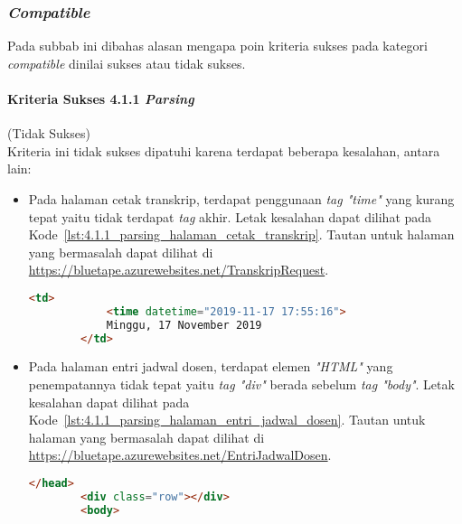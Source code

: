 \subsubsection{\textit{Compatible}}
\label{subsubsec:kepatuhan_bluetape_compatible}
Pada subbab ini dibahas alasan mengapa poin kriteria sukses pada kategori \textit{compatible} dinilai sukses atau tidak sukses.

\paragraph{Kriteria Sukses 4.1.1 \textit{Parsing}}
\label{par:kepatuhan_bluetape_kriteria_sukses_4.1.1}
(Tidak Sukses)\\

Kriteria ini tidak sukses dipatuhi karena terdapat beberapa kesalahan, antara lain:

\begin{itemize}
    \item Pada halaman cetak transkrip, terdapat penggunaan \textit{tag "time"} yang kurang tepat yaitu tidak terdapat \textit{tag} akhir. Letak kesalahan dapat dilihat pada \mbox{Kode \ref{lst:4.1.1_parsing_halaman_cetak_transkrip}}. Tautan untuk halaman yang bermasalah dapat dilihat di \url{https://bluetape.azurewebsites.net/TranskripRequest}.
    \begin{lstlisting}[frame=single, label={lst:4.1.1_parsing_halaman_cetak_transkrip}, language=HTML, caption=Pelanggaran Kriteria Sukses 4.1.1 pada Halaman Cetak Transkrip]
        <td>
            <time datetime="2019-11-17 17:55:16">
            Minggu, 17 November 2019
        </td>
    \end{lstlisting}

    \item Pada halaman entri jadwal dosen, terdapat elemen \textit{"HTML"} yang penempatannya tidak tepat yaitu \textit{tag "div"} berada sebelum \textit{tag "body"}. Letak kesalahan dapat dilihat pada \mbox{Kode \ref{lst:4.1.1_parsing_halaman_entri_jadwal_dosen}}. Tautan untuk halaman yang bermasalah dapat dilihat di \url{https://bluetape.azurewebsites.net/EntriJadwalDosen}.
    \begin{lstlisting}[frame=single, label={lst:4.1.1_parsing_halaman_entri_jadwal_dosen}, language=HTML, caption=Pelanggaran Kriteria Sukses 4.1.1 pada Halaman Entri Jadwal Dosen]
        </head>
        <div class="row"></div>        
        <body>
    \end{lstlisting}
\end{itemize}

